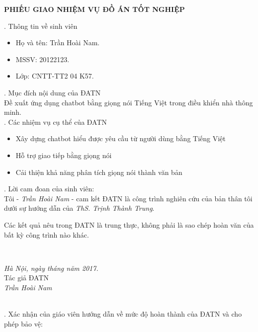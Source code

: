 \documentclass[12pt]{report}
\begin{document}
\setcounter{page}{1}

\begin{center}
{\large \textbf{PHIẾU GIAO NHIỆM VỤ ĐỒ ÁN TỐT NGHIỆP}}
\end{center}

. Thông tin về sinh viên
\begin{itemize}
	\item Họ và tên: Trần Hoài Nam.
	\item MSSV: 20122123.
	\item Lớp: CNTT-TT2 04 K57.
\end{itemize}

. Mục đích nội dung của ĐATN\\
\noindent Đề xuất ứng dụng chatbot bằng giọng nói Tiếng Việt trong điều khiển nhà thông minh.\\[0.4cm]
. Các nhiệm vụ cụ thể của ĐATN
\begin{itemize}
	\item Xây dựng chatbot hiểu được yêu cầu từ người dùng bằng Tiếng Việt
	\item Hỗ trợ giao tiếp bằng giọng nói
	\item Cải thiện khả năng phân tích giọng nói thành văn bản
\end{itemize}

. Lời cam đoan của sinh viên:\\
Tôi - \textit{Trần Hoài Nam} - cam kết ĐATN là công trình nghiên cứu của bản thân tôi dưới sự hướng dẫn của \textit{ThS. Trịnh Thành Trung}.

\noindent Các kết quả nêu trong ĐATN là trung thực, không phải là sao chép hoàn văn của bất kỳ công trình nào khác.\\[0.5cm]
  
\begin{minipage}{0.3\textwidth}
\hspace{1cm}
\end{minipage}
~
\begin{minipage}{0.6\textwidth}
\centering
\textit{Hà Nội, ngày \hspace{0.3cm} tháng  \hspace{0.3cm} năm 2017.} \\
Tác giả ĐATN \\[2cm]
\textit{Trần Hoài Nam}
\end{minipage}\\[0.5cm]
. Xác nhận của giáo viên hướng dẫn về mức độ hoàn thành của ĐATN và cho phép bảo vệ:
  
\end{document}
